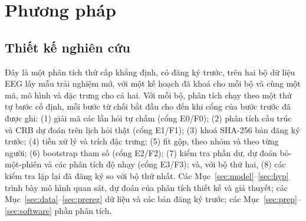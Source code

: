\section{Phương pháp}
\label{sec:methods}

\subsection{Thiết kế nghiên cứu}
\label{sec:design}
Đây là một phân tích thứ cấp khẳng định, có đăng ký trước, trên hai bộ dữ liệu EEG lấy mẫu trải nghiệm mở, với một kế hoạch đã khoá cho mỗi bộ và cùng một mã, mô hình và đặc trưng cho cả hai. Với mỗi bộ, phân tích chạy theo một thứ tự bước cố định, mỗi bước từ chối bắt đầu cho đến khi cổng của bước trước đã được ghi: (1) giải mã các lần hỏi tự chấm (cổng E0/F0); (2) phân tích cấu trúc và CRB dự đoán trên lịch hỏi thật (cổng E1/F1); (3) khoá SHA-256 bản đăng ký trước; (4) tiền xử lý và trích đặc trưng; (5) fit gộp, theo nhóm và theo từng người; (6) bootstrap tham số (cổng E2/F2); (7) kiểm tra phần dư, dự đoán bỏ-một-phiên và các phân tích độ nhạy (cổng E3/F3); và, với bộ thứ hai, (8) các kiểm tra lặp lại đã đăng ký so với bộ thứ nhất. Các Mục~\ref{sec:model}--\ref{sec:hyp} trình bày mô hình quan sát, dự đoán của phân tích thiết kế và giả thuyết; các Mục~\ref{sec:data}--\ref{sec:prereg} dữ liệu và các bản đăng ký trước; các Mục~\ref{sec:prep}--\ref{sec:software} phần phân tích.

